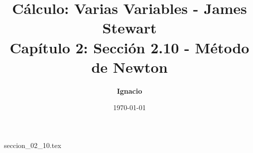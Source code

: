 \documentclass[11pt,spanish,oneside]{report}
\title{\textbf{Cálculo: Varias Variables - James Stewart} \\ \Large Capítulo 2: Sección 2.10 - Método de Newton}
\author{\textbf{Ignacio}}
\date{\today}
\begin{document}
\maketitle

{seccion_02_10.tex}
\end{document}
